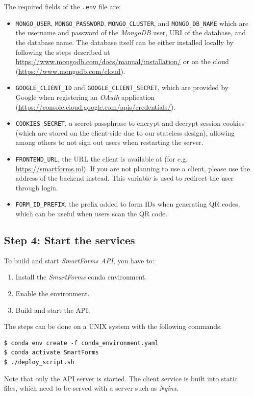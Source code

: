 \documentclass[11pt, a4paper]{report}
\def\code#1{\texttt{#1}}
\begin{document}
The required fields of the \code{.env} file are:
\begin{itemize}
	\item \code{MONGO\_USER}, \code{MONGO\_PASSWORD}, \code{MONGO\_CLUSTER}, and \code{MONGO\_DB\_NAME} which are the username and password of the \textit{MongoDB} user, URI of the database, and the database name. The database itself can be either installed locally by following the steps described at \url{https://www.mongodb.com/docs/manual/installation/} or on the cloud (\url{https://www.mongodb.com/cloud}).
	\item \code{GOOGLE\_CLIENT\_ID} and \code{GOOGLE\_CLIENT\_SECRET}, which are provided by Google when registering an \textit{OAuth} application (\url{https://console.cloud.google.com/apis/credentials/}).
	\item \code{COOKIES\_SECRET}, a secret passphrase to encrypt and decrypt session cookies (which are stored on the client-side due to our stateless design), allowing among others to not sign out users when restarting the server.
	\item \code{FRONTEND\_URL}, the URL the client is available at (for e.g. \url{https://smartforms.ml}). If you are not planning to use a client, please use the address of the backend instead. This variable is used to redirect the user through login.
	\item \code{FORM\_ID\_PREFIX}, the prefix added to form IDs when generating QR codes, which can be useful when users scan the QR code.
\end{itemize}

\subsection*{Step 4: Start the services}

To build and start \textit{SmartForms API}, you have to:
\begin{enumerate}
	\item Install the \textit{SmartForms} conda environment.
	\item Enable the environment.
	\item Build and start the API.
\end{enumerate}

The steps can be done on a UNIX system with the following commands:

\begin{verbatim}
$ conda env create -f conda_environment.yaml
$ conda activate SmartForms
$ ./deploy_script.sh
\end{verbatim}

Note that only the API server is started. The client service is built into static files, which need to be served with a server such as \textit{Nginx}.
\end{document}
